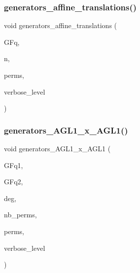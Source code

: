\subsubsection{\texorpdfstring{generators\+\_\+affine\+\_\+translations()}{generators\_affine\_translations()}}
{\footnotesize\ttfamily void generators\+\_\+affine\+\_\+translations (\begin{DoxyParamCaption}\item[{\mbox{\hyperlink{classfinite__field}{finite\+\_\+field}} \&}]{G\+Fq,  }\item[{\mbox{\hyperlink{galois_8h_a09fddde158a3a20bd2dcadb609de11dc}{I\+NT}}}]{n,  }\item[{\mbox{\hyperlink{galois_8h_a09fddde158a3a20bd2dcadb609de11dc}{I\+NT}} $\ast$}]{perms,  }\item[{\mbox{\hyperlink{galois_8h_a09fddde158a3a20bd2dcadb609de11dc}{I\+NT}}}]{verbose\+\_\+level }\end{DoxyParamCaption})}

\mbox{\label{group__generators_8_c_a59d9573735ad78a49493c5fdde859e31}} 
\subsubsection{\texorpdfstring{generators\+\_\+\+A\+G\+L1\+\_\+x\+\_\+\+A\+G\+L1()}{generators\_AGL1\_x\_AGL1()}}
{\footnotesize\ttfamily void generators\+\_\+\+A\+G\+L1\+\_\+x\+\_\+\+A\+G\+L1 (\begin{DoxyParamCaption}\item[{\mbox{\hyperlink{classfinite__field}{finite\+\_\+field}} \&}]{G\+Fq1,  }\item[{\mbox{\hyperlink{classfinite__field}{finite\+\_\+field}} \&}]{G\+Fq2,  }\item[{\mbox{\hyperlink{galois_8h_a09fddde158a3a20bd2dcadb609de11dc}{I\+NT}} \&}]{deg,  }\item[{\mbox{\hyperlink{galois_8h_a09fddde158a3a20bd2dcadb609de11dc}{I\+NT}} \&}]{nb\+\_\+perms,  }\item[{\mbox{\hyperlink{galois_8h_a09fddde158a3a20bd2dcadb609de11dc}{I\+NT}} $\ast$\&}]{perms,  }\item[{\mbox{\hyperlink{galois_8h_a09fddde158a3a20bd2dcadb609de11dc}{I\+NT}}}]{verbose\+\_\+level }\end{DoxyParamCaption})}

